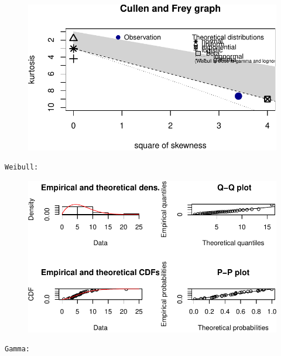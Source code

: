 \documentclass[
  letterpaper,
  DIV=11,
  numbers=noendperiod]{scrartcl}
\begin{document}
\begin{figure}[H]

{\centering \includegraphics{quiz5_files/figure-pdf/unnamed-chunk-31-1.pdf}

}

\end{figure}

\begin{verbatim}
Weibull: 
\end{verbatim}

\begin{figure}[H]

{\centering \includegraphics{quiz5_files/figure-pdf/unnamed-chunk-31-2.pdf}

}

\end{figure}

\begin{verbatim}
Gamma: 
\end{verbatim}
\end{document}

